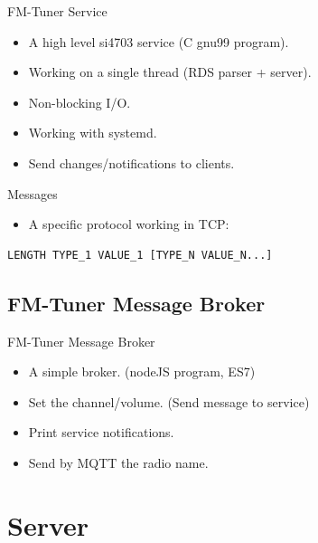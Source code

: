\documentclass{beamer}
\begin{document}
\begin{frame}[fragile]
	\begin{block}{FM-Tuner Service}
		\begin{itemize}
			\item A high level si4703 service (C gnu99 program).
			\item Working on a single thread (RDS parser + server).
			\item Non-blocking I/O.
			\item Working with systemd.
			\item Send changes/notifications to clients.
		\end{itemize}
	\end{block}
	\begin{block}{Messages}
		\begin{itemize}
			\item A specific protocol working in TCP:
		\end{itemize}
		\begin{center}
			\begin{minipage}{10cm}
				\begin{verbatim}
LENGTH TYPE_1 VALUE_1 [TYPE_N VALUE_N...]
				\end{verbatim}
			\end{minipage}
		\end{center}
	\end{block}
\end{frame}

\subsection{FM-Tuner Message Broker}

\begin{frame}
	\begin{block}{FM-Tuner Message Broker}
		\begin{itemize}
			\item A simple broker. (nodeJS program, ES7)
			\item Set the channel/volume. (Send message to service)
			\item Print service notifications.
			\item Send by MQTT the radio name.
		\end{itemize}
	\end{block}
\end{frame}

\section{Server}
\end{document}
